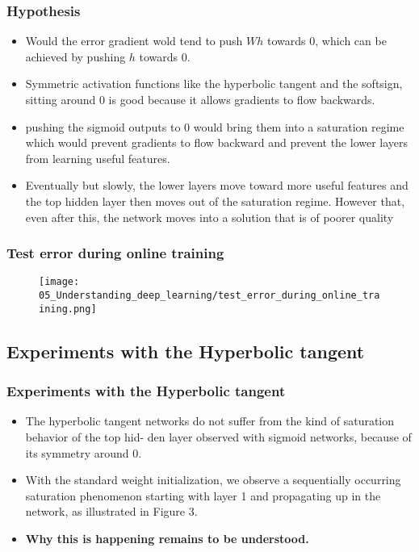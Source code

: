 \begin{frame}
  \frametitle{Hypothesis}

  \begin{itemize}
    \item Would the error gradient wold tend to push $Wh$ towards 0, which can be achieved by pushing $h$ towards $0$. 
    
    \item  Symmetric activation functions like the hyperbolic tangent and the softsign, sitting around 0 is good because it allows gradients to flow backwards.
    
    \item pushing the sigmoid outputs to 0 would bring them into a saturation regime which would prevent gradients to flow backward and prevent the lower layers from learning useful features. 
    
    \item Eventually but slowly, the lower layers move toward more useful features and the top hidden layer then moves out of the saturation regime. However that, even after this, the network moves into a solution that is of poorer quality 
  \end{itemize}

\end{frame}


\begin{frame}
  \frametitle{Test error during online training}

  \begin{figure}[t]
    \centering
    \texttt{[image: 05\_Understanding\_deep\_learning/test\_error\_during\_online\_training.png]}
  \end{figure}
\end{frame}


\subsection{Experiments with the Hyperbolic tangent}

\begin{frame}
  \frametitle{Experiments with the Hyperbolic tangent}

  \begin{itemize}
    \item The hyperbolic tangent networks do not suffer from the kind of saturation behavior of the top hid- den layer observed with sigmoid networks, because of its symmetry around 0.
    \item With the standard weight initialization, we observe a sequentially occurring saturation phenomenon starting with layer 1 and propagating up in the network, as illustrated in Figure 3. 
    \item \textbf{Why this is happening remains to be understood.}

  \end{itemize}

\end{frame}


